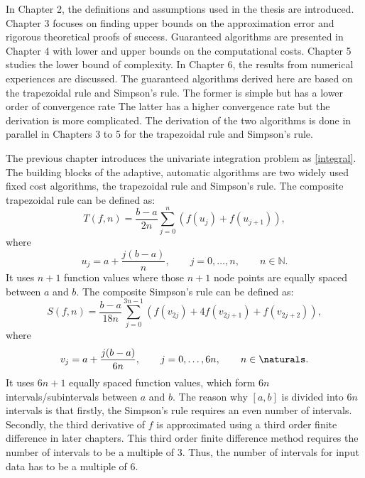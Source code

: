 \documentclass{iitthesis}
\theoremstyle{definition}
\theoremstyle{remark}
\begin{document}

In Chapter 2, the definitions and assumptions used in the thesis are introduced. Chapter 3 focuses on finding upper bounds on the approximation error and rigorous theoretical proofs of success. Guaranteed algorithms are presented in Chapter 4 with lower and upper bounds on the computational costs. Chapter 5 studies the lower bound of complexity. In Chapter 6, the results from numerical experiences are discussed. The guaranteed algorithms derived here are based on the trapezoidal rule and Simpson's rule. The former is simple but has a lower order of convergence rate The latter has a higher convergence rate but the derivation is more complicated. The derivation of the two algorithms is done in parallel in Chapters 3 to 5 for the trapezoidal rule and Simpson's rule.

\clearpage





The previous chapter introduces the univariate integration problem as \eqref{integral}. The building blocks of the adaptive, automatic algorithms are two widely used fixed cost algorithms, the trapezoidal rule and Simpson's rule.
The composite trapezoidal rule can be defined as:
\begin{equation}\label{traprule}
  T(f,n)=\frac{b-a}{2n}\sum_{j=0}^{n}(f(u_{j})+f(u_{j+1})),
\end{equation}
where
\begin{equation}\label{upts}
u_j=a+\frac{j(b-a)}{n}, \qquad j=0, \ldots, n, \qquad n\in\mathbb{N}.
\end{equation}
It uses $n+1$ function values where those $n+1$ node points are equally spaced between $a$ and $b$. The composite Simpson's rule can be defined as:
\begin{equation}\label{simrule}
  S(f,n)=\frac{b-a}{18n}\sum_{j=0}^{3n-1}(f(v_{2j})+4f(v_{2j+1})+f(v_{2j+2})),
\end{equation}
where
\begin{equation}\label{vpts}
v_j=a+\frac{j(b-a)}{6n}, \qquad j=0, \ldots, 6n, \qquad n\in \naturals.
\end{equation}
It uses $6n+1$ equally spaced function values, which form $6n$ intervals/subintervals between $a$ and $b$. The reason why $[a,b]$ is divided into $6n$ intervals is that firstly, the Simpson's rule requires an even number of intervals. Secondly, the third derivative of $f$ is approximated using a third order finite difference in later chapters. This third order finite difference method requires the number of intervals to be a multiple of 3. Thus, the number of intervals for input data has to be a multiple of 6.
\end{document}
